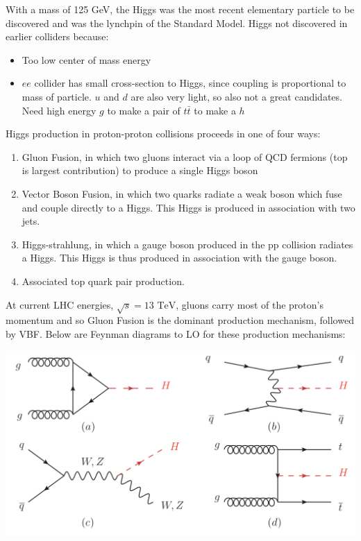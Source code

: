 With a mass of 125 GeV, the Higgs was the most recent elementary particle to be discovered and was the lynchpin of the Standard Model. Higgs not discovered in earlier colliders because:
\begin{itemize}
    \item Too low center of mass energy
    \item $ee$ collider has small cross-section to Higgs, since coupling is proportional to mass of particle.  $u$ and $d$ are also very light, so also not a great candidates. Need high energy $g$ to make a pair of $t\bar{t}$ to make a $h$
\end{itemize}
Higgs production in proton-proton collisions proceeds in one of four ways:
\begin{enumerate}[label=(\alph*)]
    \item Gluon Fusion, in which two gluons interact via a loop of QCD fermions (top is largest contribution) to produce a single Higgs boson
    
    \item Vector Boson Fusion, in which two quarks radiate a weak boson which fuse and couple directly to a Higgs. This Higgs is produced in association with two jets.
    
    \item Higgs-strahlung, in which a gauge boson produced in the pp collision radiates a Higgs. This Higgs is thus produced in association with the gauge boson.
    
    \item Associated top quark pair production.
\end{enumerate} 

At current LHC energies, $\sqrt{s} = 13 \text{ TeV}$, gluons carry most of the proton's momentum and so Gluon Fusion is the dominant production mechanism, followed by VBF. Below are Feynman diagrams to LO for these production mechanisms:

\begin{center}
    \includegraphics[scale=0.5]{physics/images/higgs_production_diagrams}
\end{center}

